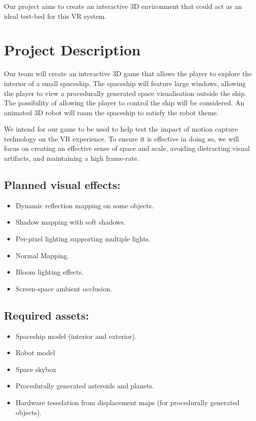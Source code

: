 \documentclass[11pt]{scrartcl} %
\begin{document}
    Our project aims to create an interactive 3D environment that could act as
    an ideal test-bed for this VR system.

\section*{Project Description}
    
    Our team will create an interactive 3D game that allows the player to
    explore the interior of a small spaceship. The spaceship will feature large
    windows, allowing the player to view a procedurally generated space
    visualisation outside the ship. The possibility of allowing the player to
    control the ship will be considered. An animated 3D robot will roam the
    spaceship to satisfy the robot theme.

    We intend for our game to be used to help test the impact of motion capture
    technology on the VR experience. To ensure it is effective in doing so, we
    will focus on creating an effective sense of space and scale, avoiding
    distracting visual artifacts, and maintaining a high  frame-rate.

    \subsection*{Planned visual effects:}
    \begin{itemize}
        \item Dynamic reflection mapping on some objects.
        \item Shadow mapping with soft shadows.
        \item Per-pixel lighting supporting multiple lights.
        \item Normal Mapping.
        \item Bloom lighting effects.
        \item Screen-space ambient occlusion.
    \end{itemize}

    \subsection*{Required assets:}
    \begin{itemize}
        \item Spaceship model (interior and exterior).
        \item Robot model
        \item Space skybox
        \item Procedurally generated asteroids and planets.
        \item Hardware tesselation from displacement maps (for procedurally generated objects).
    \end{itemize}
\end{document}
